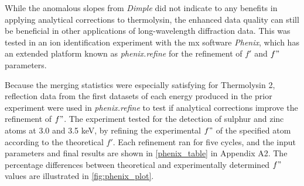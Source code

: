 While the anomalous slopes from \textit{Dimple} did not indicate to any benefits in applying analytical corrections to thermolysin, the enhanced data quality can still be beneficial in other applications of long-wavelength diffraction data. This was tested in an ion identification experiment with the \ac{mx} software \textit{Phenix}, which has an extended platform known as \textit{phenix.refine} for the refinement of $f'$ and $f"$ parameters.

Because the merging statistics were especially satisfying for Thermolysin 2, reflection data from the first datasets of each energy produced 
in the prior experiment were used in \textit{phenix.refine} to test if analytical corrections improve the refinement of $f"$. The experiment tested for the detection of sulphur and zinc atoms at 3.0 and 3.5 \unit{keV}, by refining the experimental $f"$ of the specified atom according to the theoretical $f'$. Each refinement ran for five cycles, and the input parameters and final results are shown in \cref{phenix_table} in Appendix A2. The percentage differences between theoretical and experimentally determined $f"$ values are illustrated in \cref{fig:phenix_plot}.%



